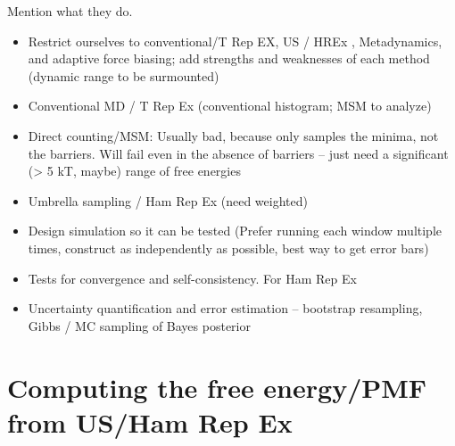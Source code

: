 \documentclass[9pt]{livecoms}
\begin{document}
Mention what they do.
\begin{itemize}
\item Restrict ourselves to conventional/T Rep EX, US / HREx , Metadynamics, and adaptive force biasing; add strengths and weaknesses of each method (dynamic range to be surmounted)
\item Conventional MD / T Rep Ex (conventional histogram; MSM to analyze)
\item Direct counting/MSM: Usually bad, because only samples the minima, not the barriers.  Will fail even in the absence of barriers -- just need a significant (> 5 kT, maybe) range of free energies
\item Umbrella sampling / Ham Rep Ex (need weighted)
\item Design simulation so it can be tested (Prefer running each window multiple times, construct as independently as possible, best way to get error bars)
\item Tests for convergence and self-consistency. For Ham Rep Ex\cite{Neale2014}
\item Uncertainty quantification and error estimation -- bootstrap resampling, Gibbs / MC sampling of Bayes posterior
\end{itemize}

\section{Computing the free energy/PMF from US/Ham Rep Ex}

\end{document}
